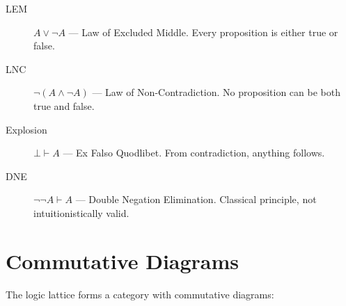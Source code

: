 \begin{description}
    \item[LEM] $A \vee \neg A$ --- Law of Excluded Middle. Every proposition is either true or false.
    \item[LNC] $\neg(A \wedge \neg A)$ --- Law of Non-Contradiction. No proposition can be both true and false.
    \item[Explosion] $\bot \vdash A$ --- Ex Falso Quodlibet. From contradiction, anything follows.
    \item[DNE] $\neg\neg A \vdash A$ --- Double Negation Elimination. Classical principle, not intuitionistically valid.
\end{description}

\section*{Commutative Diagrams}

The logic lattice forms a category with commutative diagrams:

\begin{center}
\end{center}

\begin{center}
\end{center}
